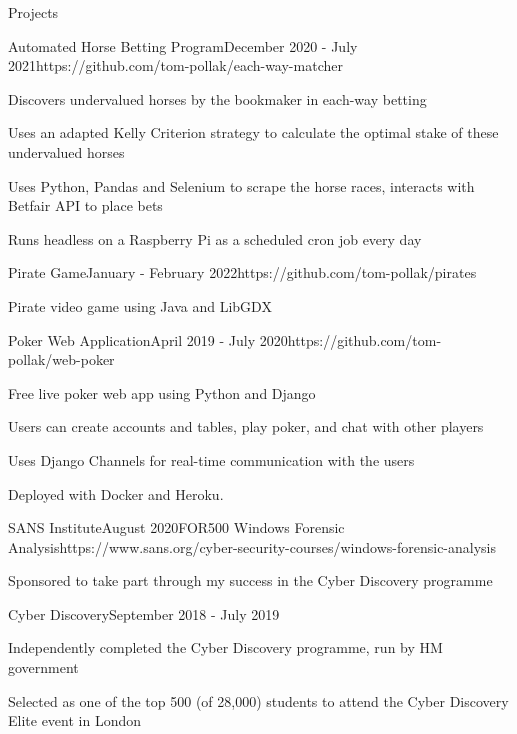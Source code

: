 \documentclass{structure} %
\begin{document}
\begin{rSection}{Projects}

\begin{rSubsection}{Automated Horse Betting Program}{December 2020 - July 2021}{}{}{https://github.com/tom-pollak/each-way-matcher}
    \item Discovers undervalued horses by the bookmaker in each-way betting
    \item Uses an adapted Kelly Criterion strategy to calculate the optimal stake of these undervalued horses
    \item Uses Python, Pandas and Selenium to scrape the horse races, interacts with Betfair API to place bets
    \item Runs headless on a Raspberry Pi as a scheduled cron job every day
\end{rSubsection}

\begin{rSubsection}{Pirate Game}{January - February 2022}{}{}{https://github.com/tom-pollak/pirates}
    \item Pirate video game using Java and LibGDX
\end{rSubsection}

\begin{rSubsection}{Poker Web Application}{April 2019 - July 2020}{}{}{https://github.com/tom-pollak/web-poker}
    \item Free live poker web app using Python and Django
    \item Users can create accounts and tables, play poker, and chat with other players
    \item Uses Django Channels for real-time communication with the users
    \item Deployed with Docker and Heroku.
\end{rSubsection}

\begin{rSubsection}{SANS Institute}{August 2020}{FOR500 Windows Forensic Analysis}{}{https://www.sans.org/cyber-security-courses/windows-forensic-analysis}
    \item Sponsored to take part through my success in the Cyber Discovery programme
\end{rSubsection}

\begin{rSubsection}{Cyber Discovery}{September 2018 - July 2019}{}{}{}
    \item Independently completed the Cyber Discovery programme, run by HM government
    \item Selected as one of the top 500 (of 28,000) students to attend the Cyber Discovery Elite event in London
\end{rSubsection}
    

\end{rSection}
\end{document}
